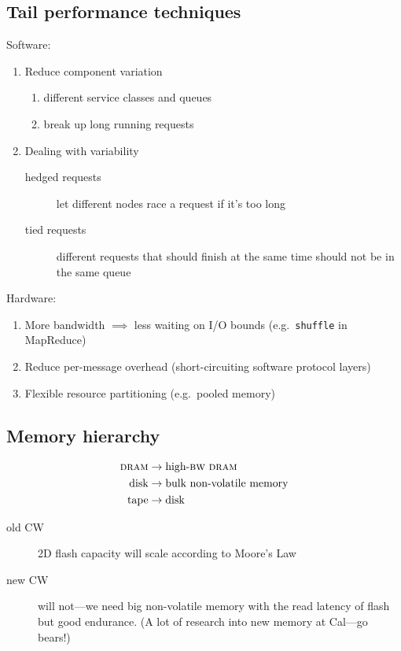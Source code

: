 \subsection{Tail performance techniques}
Software:
\begin{enumerate}
	\item Reduce component variation
	\begin{enumerate}
		\item different service classes and queues
		\item break up long running requests
	\end{enumerate}
	\item Dealing with variability
	\begin{description}
		\item[hedged requests] let different nodes race a request if it's too long
		\item[tied requests] different requests that should finish at the same time should not be in the same queue
	\end{description}
\end{enumerate}
Hardware:
\begin{enumerate}
	\item More bandwidth \ensuremath{\implies} less waiting on I/O bounds (e.g.~\texttt{shuffle} in MapReduce)
	\item Reduce per-message overhead (short-circuiting software protocol layers)
	\item Flexible resource partitioning (e.g.~pooled memory)
\end{enumerate}

\subsection{Memory hierarchy}
\begin{align*}
	\text{\textsc{dram}} &\to \text{high-\textsc{bw} \textsc{dram}}\\
	\text{disk} &\to \text{bulk non-volatile memory}\\
	\text{tape} &\to \text{disk}
\end{align*}
\begin{description}
	\item[old CW] 2D flash capacity will scale according to Moore's Law
	\item[new CW] will not---we need big non-volatile memory with the read latency of flash but good endurance. (A lot of research into new memory at Cal---go bears!)
\end{description}

